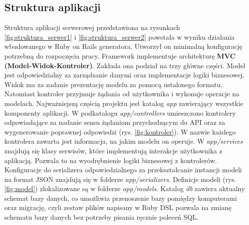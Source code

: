 \documentclass[declaration,shortabstract]{iithesis}
\begin{document}
\subsection{Struktura aplikacji}
Struktura aplikacji serwerowej przedstawiona na rysunkach \ref{fig:struktura_serwer1} i \ref{fig:struktura_serwer2} powstała w wyniku działania wbudowanego w Ruby on Rails generatora. Utworzył on minimalną konfigurację potrzebną do rozpoczęcia pracy. Framework implementuje architekturę \textbf{MVC (Model-Widok-Kontroler)}. Zakłada ona podział na trzy główne części. Model jest odpowiedzialny za zarządzanie danymi oraz implementacje logiki biznesowej. Widok ma za zadanie prezentację modelu za pomocą ustalonego formatu. Natomiast kontroler przyjmuje żądania od użytkownika i wykonuje operacje na modelach. Najważniejszą częścią projektu jest katalog \textit{app} zawierający wszystkie komponenty aplikacji. W podkatalogu \textit{app/controllers} umieszczono kontrolery odpowiadające za nadanie sensu żądaniom przychodzącym do API oraz za wygenerowanie poprawnej odpowiedzi (rys. \ref{fig:kontroler}). W nazwie każdego kontrolera zawarta jest informacja, na jakim modelu on operuje. W \textit{app/services} znajdują się klasy serwisów, które implementują interakcje użytkownika z aplikacją. Pozwala to na wyodrębnienie logiki biznesowej z kontrolerów. Konfiguracje do serializera odpowiedzialnego za przekształcanie instancji modeli na format JSON znajdują się w folderze \textit{app/serializers}. Definicje modeli (rys. \ref{fig:model}) zlokalizowane są w folderze \textit{app/models}. Katalog \textit{db} zawiera aktualny schemat bazy danych, co umożliwia przenoszenie bazy pomiędzy komputerami oraz migrację, czyli zestaw plików napisany w Ruby DSL pozwala na zmianę schematu bazy danych bez potrzeby pisania ręcznie poleceń SQL.
\end{document}
